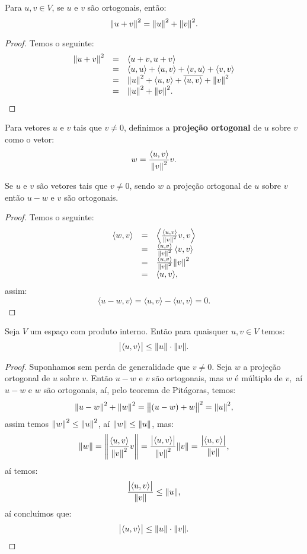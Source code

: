 \documentclass[11pt,twoside,a4paper]{book}
\begin{document}
\begin{proposicao}
Para $u,v\in V$, se $u$ e $v$ são ortogonais, então:
\[
\norm{u+v}^2=\norm{u}^2+\norm{v}^2.
\]
\end{proposicao}
\begin{proof}
Temos o seguinte:
\[
\begin{array}{rcl}
\norm{u+v}^2&=&\langle u+v,u+v\rangle\\
&=&\langle u,u\rangle+\langle u,v\rangle+\langle v,u\rangle+\langle v,v\rangle\\
&=&\norm{u}^2+\langle u,v\rangle+\overline{\langle u,v\rangle}+\norm{v}^2\\
&=&\norm{u}^2+\norm{v}^2.
\end{array}
\]
\end{proof}

\begin{definicao}
Para vetores $u$ e $v$ tais que $v\neq 0$, definimos a \textbf{projeção ortogonal} de $u$ sobre $v$ como o vetor:
\[
w=\frac{\langle u,v\rangle}{\norm{v}^2}v.
\]
\end{definicao}

\begin{proposicao}
Se $u$ e $v$ são vetores tais que $v\neq 0$, sendo $w$ a projeção ortogonal de $u$ sobre $v$ então $u-w$ e $v$ são ortogonais.
\end{proposicao}
\begin{proof}
Temos o seguinte:
\[
\begin{array}{rcl}
\langle w,v\rangle&=&\left\langle \frac{\langle u,v\rangle}{\norm{v}^2}v,v\right\rangle\\
&=&\frac{\langle u,v\rangle}{\norm{v}^2}\left\langle v,v\right\rangle\\
&=&\frac{\langle u,v\rangle}{\norm{v}^2}\norm{v}^2\\
&=&\langle u,v\rangle,
\end{array}
\]
assim:
\[
\langle u-w,v\rangle=\langle u,v\rangle-\langle w,v\rangle=0.
\]
\end{proof}

\begin{proposicao}
Seja $V$ um espaço com produto interno. Então para quaisquer $u,v\in V$ temos:
\[
\abs{\langle u,v\rangle}\leq\norm{u}\cdot\norm{v}.
\]
\end{proposicao}
\begin{proof}
Suponhamos sem perda de generalidade que $v\neq 0.$ Seja $w$ a projeção ortogonal de $u$ sobre $v.$ Então $u-w$ e $v$ são ortogonais, mas $w$ é múltiplo de $v,$ aí $u-w$ e $w$ são ortogonais, aí, pelo teorema de Pitágoras, temos:
\[
\norm{u-w}^2+\norm{w}^2=\norm{(u-w)+w}^2=\norm{u}^2,
\]
assim temos $\norm{w}^2\leq\norm{u}^2$, aí $\norm{w}\leq\norm{u}$, mas:
\[
\norm{w}=\norm{\frac{\langle u,v\rangle}{\norm{v}^2}v}=\frac{\abs{\langle u,v\rangle}}{\norm{v}^2}\norm{v}=\frac{\abs{\langle u,v\rangle}}{\norm{v}},
\]
aí temos:
\[
\frac{\abs{\langle u,v\rangle}}{\norm{v}}\leq\norm{u},
\]
aí concluímos que:
\[
\abs{\langle u,v\rangle}\leq\norm{u}\cdot\norm{v}.
\]
\end{proof}
\end{document}
